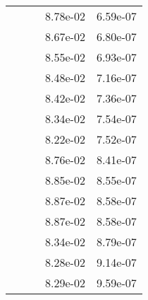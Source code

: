 \begin{table}
\begin{tabular}{c|cc|cc|}
\multicolumn{1}{|c|}{} & \multicolumn{1}{|c|}{} & \multicolumn{1}{|c|}{} & \multicolumn{1}{|c|}{  8.78e-02} & \multicolumn{1}{|c|}{  6.59e-07} \\ 
\multicolumn{1}{|c|}{} & \multicolumn{1}{|c|}{} & \multicolumn{1}{|c|}{} & \multicolumn{1}{|c|}{  8.67e-02} & \multicolumn{1}{|c|}{  6.80e-07} \\ 
\multicolumn{1}{|c|}{} & \multicolumn{1}{|c|}{} & \multicolumn{1}{|c|}{} & \multicolumn{1}{|c|}{  8.55e-02} & \multicolumn{1}{|c|}{  6.93e-07} \\ 
\multicolumn{1}{|c|}{} & \multicolumn{1}{|c|}{} & \multicolumn{1}{|c|}{} & \multicolumn{1}{|c|}{  8.48e-02} & \multicolumn{1}{|c|}{  7.16e-07} \\ 
\multicolumn{1}{|c|}{} & \multicolumn{1}{|c|}{} & \multicolumn{1}{|c|}{} & \multicolumn{1}{|c|}{  8.42e-02} & \multicolumn{1}{|c|}{  7.36e-07} \\ 
\multicolumn{1}{|c|}{} & \multicolumn{1}{|c|}{} & \multicolumn{1}{|c|}{} & \multicolumn{1}{|c|}{  8.34e-02} & \multicolumn{1}{|c|}{  7.54e-07} \\ 
\multicolumn{1}{|c|}{} & \multicolumn{1}{|c|}{} & \multicolumn{1}{|c|}{} & \multicolumn{1}{|c|}{  8.22e-02} & \multicolumn{1}{|c|}{  7.52e-07} \\ 
\multicolumn{1}{|c|}{} & \multicolumn{1}{|c|}{} & \multicolumn{1}{|c|}{} & \multicolumn{1}{|c|}{  8.76e-02} & \multicolumn{1}{|c|}{  8.41e-07} \\ 
\multicolumn{1}{|c|}{} & \multicolumn{1}{|c|}{} & \multicolumn{1}{|c|}{} & \multicolumn{1}{|c|}{  8.85e-02} & \multicolumn{1}{|c|}{  8.55e-07} \\ 
\multicolumn{1}{|c|}{} & \multicolumn{1}{|c|}{} & \multicolumn{1}{|c|}{} & \multicolumn{1}{|c|}{  8.87e-02} & \multicolumn{1}{|c|}{  8.58e-07} \\ 
\multicolumn{1}{|c|}{} & \multicolumn{1}{|c|}{} & \multicolumn{1}{|c|}{} & \multicolumn{1}{|c|}{  8.87e-02} & \multicolumn{1}{|c|}{  8.58e-07} \\ 
\multicolumn{1}{|c|}{} & \multicolumn{1}{|c|}{} & \multicolumn{1}{|c|}{} & \multicolumn{1}{|c|}{  8.34e-02} & \multicolumn{1}{|c|}{  8.79e-07} \\ 
\multicolumn{1}{|c|}{} & \multicolumn{1}{|c|}{} & \multicolumn{1}{|c|}{} & \multicolumn{1}{|c|}{  8.28e-02} & \multicolumn{1}{|c|}{  9.14e-07} \\ 
\multicolumn{1}{|c|}{} & \multicolumn{1}{|c|}{} & \multicolumn{1}{|c|}{} & \multicolumn{1}{|c|}{  8.29e-02} & \multicolumn{1}{|c|}{  9.59e-07} \\ 

\end{tabular}
\end{table}

